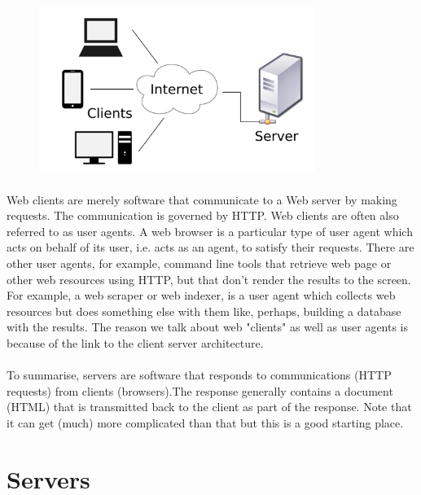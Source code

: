 \begin{figure}[H]
\centering
\includegraphics[width=0.8\textwidth]{figures/client-server-architecture.png}
\label{fig:client-server-architecture}
\end{figure}


\paragraph{} Web clients are merely software that communicate to a Web server by making requests. The communication is governed by HTTP. Web clients are often also referred to as user agents. A web browser is a particular type of user agent which acts on behalf of its user, i.e. acts as an agent, to satisfy their requests. There are other user agents, for example, command line tools that retrieve web page or other web resources using HTTP, but that don't render the results to the screen. For example, a web scraper or web indexer, is a user agent which collects web resources but does something else with them like, perhaps, building a database with the results. The reason we talk about web "clients" as well as user agents is because of the link to the client server architecture.
\paragraph{} To summarise, servers are software that responds to communications (HTTP requests) from clients (browsers).The response generally contains a document (HTML) that is transmitted back to the client as part of the response. Note that it can get (much) more complicated than that but this is a good starting place.


\section{Servers}
